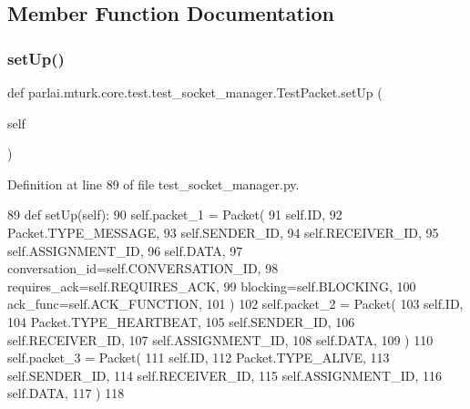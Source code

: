 \subsection{Member Function Documentation}
\mbox{\label{classparlai_1_1mturk_1_1core_1_1test_1_1test__socket__manager_1_1TestPacket_ad224aba0d9065c397e84634f1aea3d1c}} 
\subsubsection{\texorpdfstring{set\+Up()}{setUp()}}
{\footnotesize\ttfamily def parlai.\+mturk.\+core.\+test.\+test\+\_\+socket\+\_\+manager.\+Test\+Packet.\+set\+Up (\begin{DoxyParamCaption}\item[{}]{self }\end{DoxyParamCaption})}



Definition at line 89 of file test\+\_\+socket\+\_\+manager.\+py.


\begin{DoxyCode}
89     \textcolor{keyword}{def }setUp(self):
90         self.packet\_1 = Packet(
91             self.ID,
92             Packet.TYPE\_MESSAGE,
93             self.SENDER\_ID,
94             self.RECEIVER\_ID,
95             self.ASSIGNMENT\_ID,
96             self.DATA,
97             conversation\_id=self.CONVERSATION\_ID,
98             requires\_ack=self.REQUIRES\_ACK,
99             blocking=self.BLOCKING,
100             ack\_func=self.ACK\_FUNCTION,
101         )
102         self.packet\_2 = Packet(
103             self.ID,
104             Packet.TYPE\_HEARTBEAT,
105             self.SENDER\_ID,
106             self.RECEIVER\_ID,
107             self.ASSIGNMENT\_ID,
108             self.DATA,
109         )
110         self.packet\_3 = Packet(
111             self.ID,
112             Packet.TYPE\_ALIVE,
113             self.SENDER\_ID,
114             self.RECEIVER\_ID,
115             self.ASSIGNMENT\_ID,
116             self.DATA,
117         )
118 
\end{DoxyCode}
\mbox{\label{classparlai_1_1mturk_1_1core_1_1test_1_1test__socket__manager_1_1TestPacket_a32af25d45af0adb7993fdac380c67da0}} 
